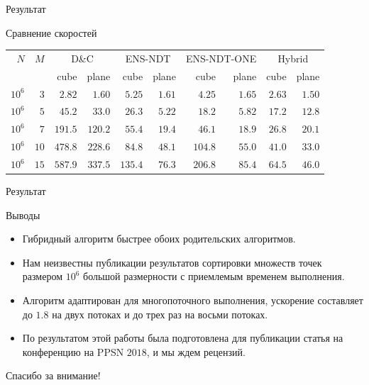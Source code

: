 \documentclass[table]{beamer}
\newcommand{\best}{\cellcolor{gray!50!white}}
\begin{document}
\begin{frame}{Результат}
\begin{block}{Сравнение скоростей}

\begin{center}
\begin{table}[!ht]
\begin{tabular}{rr|rr|rr|rr|rr}
$N$&$M$ & \multicolumn{2}{c|}{D\&C} 
        & \multicolumn{2}{c|}{ENS-NDT} 
        & \multicolumn{2}{c|}{ENS-NDT-ONE} 
        & \multicolumn{2}{c}{Hybrid} \\
& & {\scriptsize cube} & {\scriptsize plane} 
  & {\scriptsize cube} & {\scriptsize plane} 
  & {\scriptsize cube} & {\scriptsize plane} 
  & {\scriptsize cube} & {\scriptsize plane} \\\hline  %
      $10^6$&$3$  & $2.82$ & $1.60$ & $5.25$ & $1.61$ & $4.25$ & $1.65$ & \best $2.63$ & \best$1.50$\\\hline
      $10^6$&$5$  & $45.2$ & $33.0$ & $26.3$ & \best$5.22$ & $18.2$ & $5.82$ & \best $17.2$ & $12.8$\\\hline
      $10^6$&$7$  & $191.5$& $120.2$& $55.4$ & $19.4$ & $46.1$ & \best$18.9$ & \best $26.8$ & $20.1$\\\hline
      $10^6$&$10$ & $478.8$& $228.6$& $84.8$ & $48.1$ & $104.8$& $55.0$ & \best $41.0$ & \best $33.0$\\\hline
      $10^6$&$15$ & $587.9$& $337.5$& $135.4$& $76.3$ & $206.8$& $85.4$ & \best $64.5$ & \best $46.0$\\\hline
\end{tabular}
\end{table}
\end{center}
\end{block}
\end{frame}

\begin{frame}{Результат}
\begin{block}{Выводы}
\begin{itemize}
\item Гибридный алгоритм быстрее обоих родительских алгоритмов.
\item Нам неизвестны публикации результатов сортировки множеств точек размером $10^6$ большой размерности с приемлемым временем выполнения.
\item Алгоритм адаптирован для многопоточного выполнения, ускорение составляет до $1.8$ на двух потоках и до трех раз на восьми потоках.
\item По результатом этой работы была подготовлена для публикации статья на конференцию на PPSN $2018$, и мы ждем рецензий. 
\end{itemize}
\end{block}
\end{frame}

\begin{frame}{}
\begin{center}
Спасибо за внимание!
\end{center}
\end{frame}

\appendix

%
\end{document}
